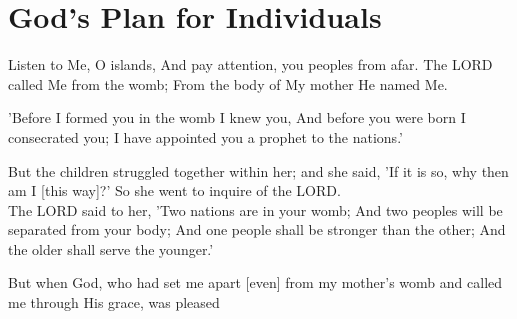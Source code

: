 \newpage

\section{God's Plan for Individuals}
\begin{scripture}[Isaiah 49:1]
    Listen to Me, O islands, And pay attention, you peoples from afar. The LORD called Me from the womb; From the body of My mother He named Me.
\end{scripture}

\vspace{4\baselineskip}

\begin{scripture}[Jeremiah 1:5]
    'Before I formed you in the womb I knew you, And before you were born I consecrated you; I have appointed you a prophet to the nations.'
\end{scripture}

\vspace{4\baselineskip}

\begin{scripture}[Genesis 25:22-23]
    But the children struggled together within her; and she said, 'If it is so, why then am I [this way]?' So she went to inquire of the LORD.\\
    The LORD said to her, 'Two nations are in your womb; And two peoples will be separated from your body; And one people shall be stronger than the other; And the older shall serve the younger.'
\end{scripture}

\vspace{4\baselineskip}

\begin{scripture}[Galatians 1:15]
    But when God, who had set me apart [even] from my mother's womb and called me through His grace, was pleased
\end{scripture}

\vspace{4\baselineskip}


\vspace{10\baselineskip}
